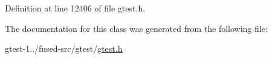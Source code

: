 \-Definition at line 12406 of file gtest.\-h.



\-The documentation for this class was generated from the following file\-:\begin{DoxyCompactItemize}
\item 
gtest-\/1../fused-\/src/gtest/\hyperlink{fused-src_2gtest_2gtest_8h}{gtest.\-h}\end{DoxyCompactItemize}
